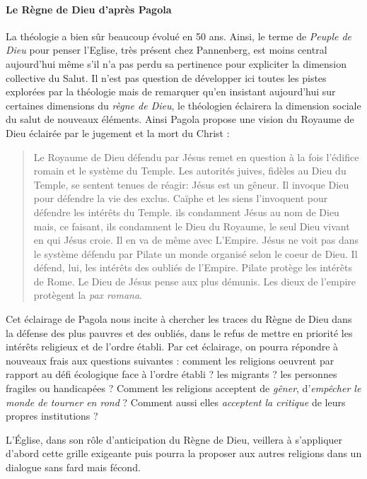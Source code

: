 \paragraph{Le Règne de Dieu d'après Pagola}
La théologie a bien sûr beaucoup évolué en 50 ans. Ainsi, le terme de \textit{Peuple de Dieu} pour penser l'Eglise, très présent chez Pannenberg, est moins central aujourd'hui même s'il n'a pas perdu sa pertinence pour expliciter la dimension collective du Salut. Il n'est pas question de développer ici toutes les pistes explorées par la théologie  mais de remarquer qu'en insistant aujourd'hui sur certaines dimensions du \textit{règne de Dieu}, le théologien éclairera la dimension sociale du salut de nouveaux éléments.
Ainsi Pagola propose une vision du Royaume de Dieu éclairée par le jugement et la mort du Christ : 
\begin{quote}
    Le Royaume de Dieu défendu par Jésus remet en question à la fois l'édifice romain et le système du Temple. Les autorités juives, fidèles au Dieu du Temple, se sentent tenues de réagir: Jésus est un gêneur. Il invoque Dieu pour défendre la vie des exclus. Caïphe et les siens l'invoquent pour défendre les intérêts du Temple. ils condamnent Jésus au nom de Dieu mais, ce faisant, ils condamnent le Dieu du Royaume, le seul Dieu vivant en qui Jésus croie. Il en va de même avec L'Empire. Jésus ne voit pas dans le système défendu par Pilate un monde organisé selon le coeur de Dieu. Il défend, lui, les intérêts des oubliés de l'Empire. Pilate protège les intérêts de Rome. Le Dieu de Jésus pense aux plus démunis. Les dieux de l'empire protègent la \textit{pax romana}.\cite[p. 402]{Pagola:Jesus} 
\end{quote}

Cet éclairage de Pagola nous incite à chercher les traces du Règne de Dieu dans la défense des plus pauvres et des oubliés, dans le refus de mettre en priorité les intérêts religieux et de l'ordre établi. Par cet éclairage, on pourra répondre à nouveaux frais aux questions suivantes :  comment les religions oeuvrent par rapport au défi écologique face à l'ordre établi ? les migrants ? les personnes fragiles ou handicapées ? Comment les religions acceptent de \textit{gêner}, d'\textit{empêcher le monde de tourner en rond} ? Comment aussi elles \textit{acceptent la critique} de leurs propres institutions ? 


L'Église, dans son rôle d'anticipation du Règne de Dieu, veillera à s'appliquer d'abord cette grille exigeante puis pourra la proposer aux autres religions dans un dialogue sans fard mais fécond.


